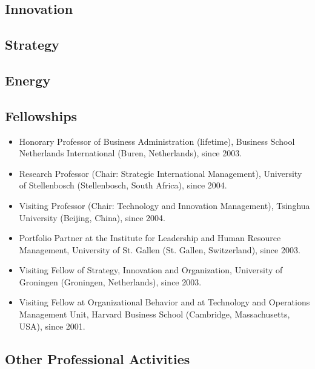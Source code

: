 

\newpage
\subsection{Innovation}



\newpage
\subsection{Strategy}



\newpage
\subsection{Energy}



\subsection{Fellowships}

\begin{itemize}
\item Honorary Professor of Business Administration (lifetime), Business School Netherlands International (Buren, Netherlands), since 2003.
\item Research Professor (Chair: Strategic International Management), University of Stellenbosch (Stellenbosch, South Africa), since 2004.
\item Visiting Professor (Chair: Technology and Innovation Management), Tsinghua University (Beijing, China), since 2004.
\item Portfolio Partner at the Institute for Leadership and Human Resource Management, University of St. Gallen (St. Gallen, Switzerland), since 2003.
\item Visiting Fellow of Strategy, Innovation and Organization, University of Groningen (Groningen, Netherlands), since 2003.
\item Visiting Fellow at Organizational Behavior and at Technology and Operations Management Unit, Harvard Business School (Cambridge, Massachusetts, USA), since 2001.
\end{itemize}

\subsection{Other Professional Activities}

